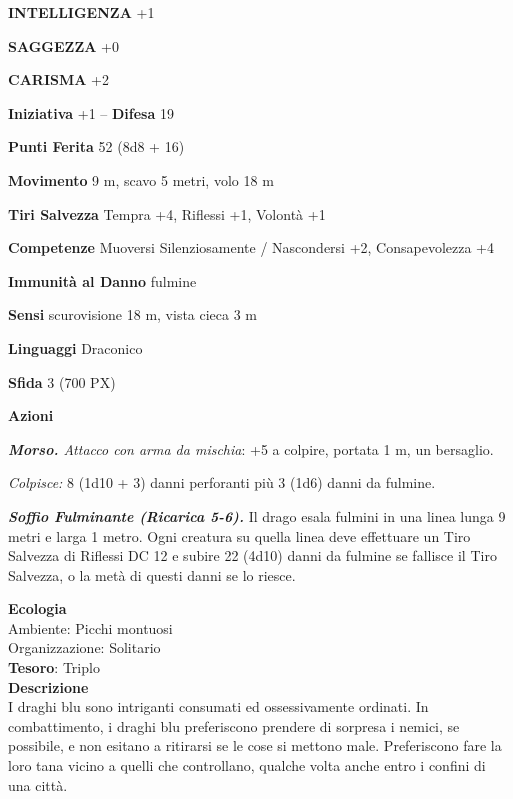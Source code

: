 \begin{multicols}{2}
\textbf{INTELLIGENZA} +1

\textbf{SAGGEZZA} +0

\textbf{CARISMA} +2

\textbf{Iniziativa} +1 -- \textbf{Difesa} 19

\textbf{Punti Ferita} 52 (8d8 + 16)

\textbf{Movimento} 9 m, scavo 5 metri, volo 18 m

\textbf{Tiri Salvezza} Tempra +4, Riflessi +1, Volontà +1

\textbf{Competenze} Muoversi Silenziosamente / Nascondersi +2, Consapevolezza +4

\textbf{Immunità al Danno} fulmine

\textbf{Sensi} scurovisione 18 m, vista cieca 3 m

\textbf{Linguaggi} Draconico

\textbf{Sfida} 3 (700 PX)

\textbf{Azioni}

\textit{\textbf{Morso.} Attacco con arma da mischia}: +5 a colpire, portata 1 m, un bersaglio.

\textit{Colpisce:} 8 (1d10 + 3) danni perforanti più 3 (1d6) danni da fulmine.

\textit{\textbf{Soffio Fulminante (Ricarica 5-6).}} Il drago esala fulmini in una linea lunga 9 metri e larga 1 metro. Ogni creatura su quella linea deve effettuare un Tiro Salvezza di Riflessi DC 12 e subire 22 (4d10) danni da fulmine se fallisce il Tiro Salvezza, o la metà di questi danni se lo riesce.

\textbf{Ecologia}\\
Ambiente: Picchi montuosi\\
Organizzazione: Solitario\\
\textbf{Tesoro}: Triplo\\
\textbf{Descrizione}\\
I draghi blu sono intriganti consumati ed ossessivamente ordinati. In combattimento, i draghi blu preferiscono prendere di sorpresa i nemici, se possibile, e non esitano a ritirarsi se le cose si mettono male. Preferiscono fare la loro tana vicino a quelli che controllano, qualche volta anche entro i confini di una città.


\end{multicols}
